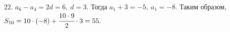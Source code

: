 22. $a_6-a_4=2d=6,\ d=3.$ Тогда $a_1+3=-5,\ a_1=-8.$ Таким образом, $S_{10}=10\cdot(-8)+\cfrac{10\cdot9}{2}\cdot3=55.$\\
